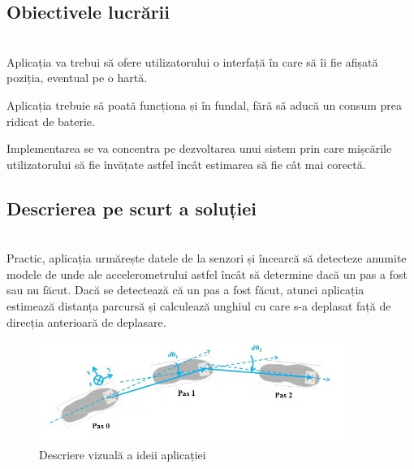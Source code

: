 \documentclass[12pt, a4paper, oneside]{article}
\begin{document}
\subsection{Obiectivele lucrării}
\\

Aplicația va trebui să ofere utilizatorului o interfață în care să îi fie afișată poziția, eventual pe o hartă.

Aplicația trebuie să poată funcționa și în fundal, fără să aducă un consum prea ridicat de baterie.

Implementarea se va concentra pe dezvoltarea unui sistem prin care mișcările utilizatorului să fie învățate astfel încât estimarea să fie cât mai corectă.\\


\subsection{Descrierea pe scurt a soluției}
\\

Practic, aplicația urmărește datele de la senzori și încearcă să detecteze anumite modele de unde ale accelerometrului astfel încât să determine dacă un pas a fost sau nu făcut. Dacă se detectează că un pas a fost făcut, atunci aplicația estimează distanța parcursă și calculează unghiul cu care s-a deplasat față de direcția anterioară de deplasare.

\begin{figure}[h]
\centering
\includegraphics[width=10cm]{figures/pedestrian-dead-reckoning-modified.jpg}
\caption{Descriere vizuală a ideii aplicației}
\label{fig:pdr_idea}
\end{figure}
\end{document}
